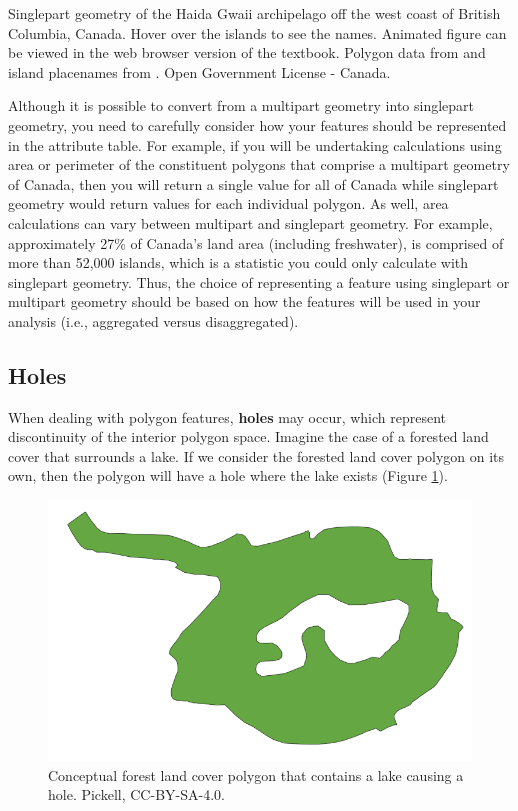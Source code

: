 \documentclass[
]{book}
\begin{document}
\label{fig:7-haida-gwaii-leaflet}Singlepart geometry of the Haida Gwaii archipelago off the west coast of British Columbia, Canada. Hover over the islands to see the names. Animated figure can be viewed in the web browser version of the textbook. Polygon data from \citet{statistics_canada_statistics_nodate} and island placenames from \citet{natural_resources_canada_natural_nodate}. Open Government License - Canada.

Although it is possible to convert from a multipart geometry into singlepart geometry, you need to carefully consider how your features should be represented in the attribute table. For example, if you will be undertaking calculations using area or perimeter of the constituent polygons that comprise a multipart geometry of Canada, then you will return a single value for all of Canada while singlepart geometry would return values for each individual polygon. As well, area calculations can vary between multipart and singlepart geometry. For example, approximately 27\% of Canada's land area (including freshwater), is comprised of more than 52,000 islands, which is a statistic you could only calculate with singlepart geometry. Thus, the choice of representing a feature using singlepart or multipart geometry should be based on how the features will be used in your analysis (i.e., aggregated versus disaggregated).

\hypertarget{holes}{%
\subsection{Holes}\label{holes}}

When dealing with polygon features, \textbf{holes} may occur, which represent discontinuity of the interior polygon space. Imagine the case of a forested land cover that surrounds a lake. If we consider the forested land cover polygon on its own, then the polygon will have a hole where the lake exists (Figure \ref{fig:7-hole}).

\begin{figure}
\includegraphics[width=0.5\linewidth]{images/07-hole} \caption{Conceptual forest land cover polygon that contains a lake causing a hole. Pickell, CC-BY-SA-4.0.}\label{fig:7-hole}
\end{figure}
\end{document}
